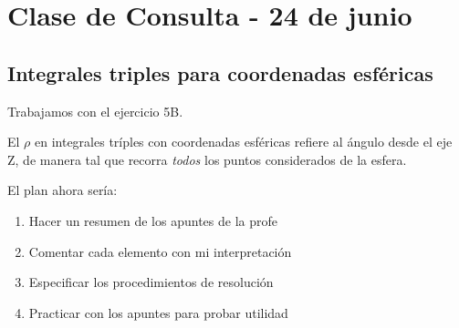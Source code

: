 \section{Clase de Consulta - 24 de junio}

\subsection{Integrales triples para coordenadas esféricas}

Trabajamos con el ejercicio 5B.

El \(\rho\) en integrales tríples con coordenadas esféricas refiere al 
ángulo desde el eje Z,
de manera tal que recorra \textit{todos} los puntos considerados de la esfera.

El plan ahora sería:
\begin{enumerate}
    \item Hacer un resumen de los apuntes de la profe 
    \item Comentar cada elemento con mi interpretación
    \item Especificar los procedimientos de resolución
    \item Practicar con los apuntes para probar utilidad
\end{enumerate}
